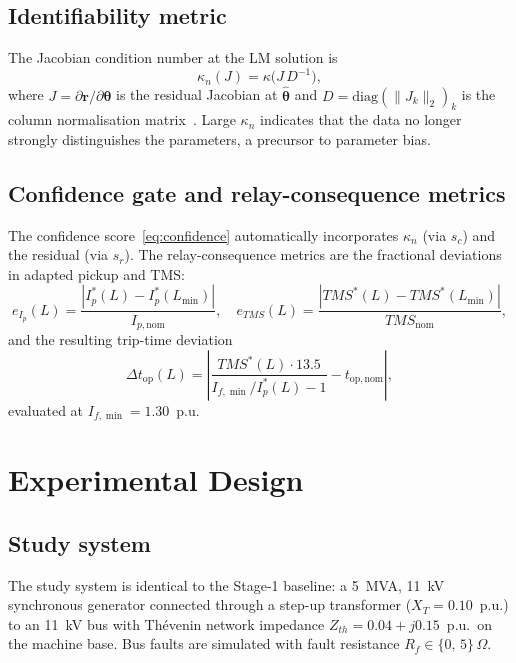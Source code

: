 \documentclass[journal,twoside,letterpaper]{IEEEtran}
\newcommand{\vect}[1]{\bm{#1}}
\newcommand{\norm}[1]{\lVert#1\rVert}
\begin{document}
\subsection{Identifiability metric}

The Jacobian condition number at the LM solution is
\begin{equation}
  \kappa_n(J) = \kappa\!\bigl(J\,D^{-1}\bigr),
\label{eq:kappa_n}
\end{equation}
where $J = \partial\vect{r}/\partial\vect\theta$ is the
residual Jacobian at $\hat{\vect\theta}$ and
$D = \mathrm{diag}(\norm{J_k}_2)_k$ is the column
normalisation matrix~\cite{Eluvathingal2025_TR01}.
Large $\kappa_n$ indicates that the data no longer
strongly distinguishes the parameters, a precursor to
parameter bias.

\subsection{Confidence gate and relay-consequence metrics}

The confidence score~\eqref{eq:confidence} automatically
incorporates $\kappa_n$ (via $s_c$) and the residual
(via $s_r$).
The relay-consequence metrics are the fractional deviations
in adapted pickup and TMS:
\begin{equation}
  e_{I_p}(L) = \frac{|I_p^\ast(L) - I_p^\ast(L_{\min})|}{I_{p,\mathrm{nom}}},
  \quad
  e_{TMS}(L) = \frac{|TMS^\ast(L) - TMS^\ast(L_{\min})|}{TMS_{\mathrm{nom}}},
\end{equation}
and the resulting trip-time deviation
\begin{equation}
  \Delta t_{\mathrm{op}}(L)
  = \left|\frac{TMS^\ast(L) \cdot 13.5}
               {I_{f,\min}/I_p^\ast(L) - 1}
    - t_{\mathrm{op,nom}}\right|,
\label{eq:dt_op}
\end{equation}
evaluated at $I_{f,\min} = 1.30$~p.u.

\section{Experimental Design}
\label{sec:experiments}

\subsection{Study system}

The study system is identical to the Stage-1 baseline: a
5~MVA, 11~kV synchronous generator connected through a
step-up transformer ($X_T = 0.10$~p.u.) to an
11~kV bus with Th\'{e}venin network impedance
$Z_{th} = 0.04 + j0.15$~p.u.\ on the machine base.
Bus faults are simulated with fault resistance
$R_f \in \{0,\,5\}\,\Omega$.
\end{document}
